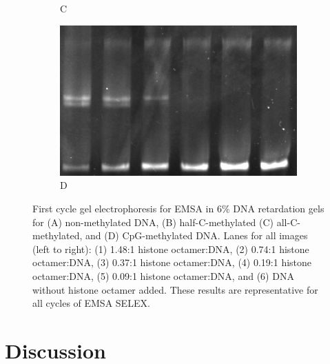 \documentclass[parskip=full, numbers=noenddot]{scrreprt}
\begin{document}
\begin{figure}[htpb]
\begin{subfigure}[htpb]{0.4\textwidth}
    \caption{C}
    \label{fig:reconstnuc_c}
  \end{subfigure}
  \begin{subfigure}[htpb]{0.4\textwidth}
    \centering
    \includegraphics[width=\textwidth]{reconstnuc_d}
    \caption{D}
    \label{fig:reconstnuc_d}
  \end{subfigure}
  \caption{First cycle gel electrophoresis for EMSA in 6\% DNA retardation gels for (A) non-methylated DNA, (B) half-C-methylated (C) all-C-methylated, and (D) CpG-methylated DNA. Lanes for all images (left to right): (1) 1.48:1 histone octamer:DNA, (2) 0.74:1 histone octamer:DNA, (3) 0.37:1 histone octamer:DNA, (4) 0.19:1 histone octamer:DNA, (5) 0.09:1 histone octamer:DNA, and (6) DNA without histone octamer added.  These results are representative for all cycles of EMSA SELEX.}
  \label{fig:reconstnuc}
\end{figure}


\section{Discussion}
\label{sec:emsaselex_discussion}


\end{document}

